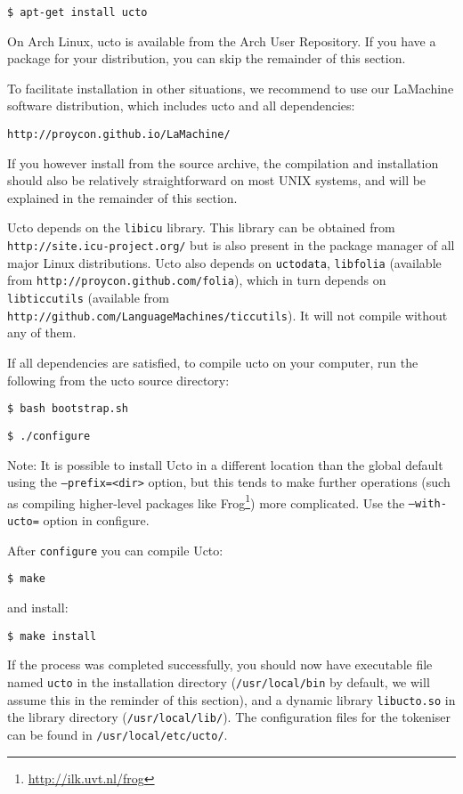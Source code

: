 \documentclass[a4paper,12pt]{report}
\begin{document}
{\tt \$ apt-get install ucto}

On Arch Linux, ucto is available from the Arch User Repository. If you have a
package for your distribution, you can skip the remainder of this section.

To facilitate installation in other situations, we recommend to use our
LaMachine software distribution, which includes ucto and all dependencies:

{\tt http://proycon.github.io/LaMachine/}

If you however install from the source archive, the compilation and installation should also be relatively straightforward on most UNIX systems, and will be explained in the remainder of this section.

Ucto depends on the \texttt{libicu} library. This library can be obtained from \\
{\tt http://site.icu-project.org/} but is also present in the package manager of all major Linux distributions.
Ucto also depends on \texttt{uctodata}, \texttt{libfolia} (available from
\texttt{http://proycon.github.com/folia}), which in turn depends on
\texttt{libticcutils} (available from \\
\texttt{http://github.com/LanguageMachines/ticcutils}). It will not compile
without any of them.

If all dependencies are satisfied, to compile ucto on your computer, run the
following from the ucto source directory:

{\tt \$ bash bootstrap.sh}

{\tt \$ ./configure}

Note: It is possible to install Ucto in a different location than the global default using the \texttt{--prefix=<dir>} option, but this tends to make further operations (such as compiling higher-level packages like Frog\footnote{\url{http://ilk.uvt.nl/frog}}) more complicated. Use the {\tt --with-ucto=} option in configure.

After {\tt configure} you can compile Ucto:

{\tt \$ make}

and install:

{\tt \$ make install }

If the process was completed successfully, you should now have
executable file named {\tt ucto} in the installation directory
({\tt /usr/local/bin} by default, we will assume this in the reminder of this section), and a dynamic library {\tt libucto.so} in
the library directory ({\tt /usr/local/lib/}). The configuration files for the tokeniser can be found in {\tt /usr/local/etc/ucto/}.
\end{document}
